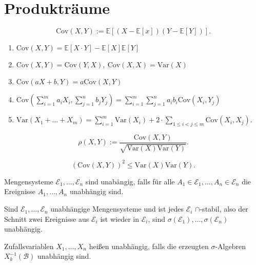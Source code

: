 \documentclass[prb,12pt, twocolumn]{revtex4-2}
\theoremstyle{definition}
\theoremstyle{definition}
\theoremstyle{definition}
\begin{document}
\section{Produktr\"{a}ume}
\begin{Note}[Kovarianz]
	\[
		\text{Cov}(X,Y):= \mathbb{E}[(X-\mathbb{E}[x])(Y-\mathbb{E}[Y])]
	.\] 
\end{Note}
\begin{Note}
	\begin{enumerate}
	\item $\text{Cov}(X, Y) = \mathbb{E}[X\cdot Y] - \mathbb{E}[X]\mathbb{E}[Y]$
	\item  $\text{Cov}(X,Y)=\text{Cov}(Y,X),~\text{Cov}(X,X)=\text{Var}(X)$
	\item  $\text{Cov}(aX+b, Y) = a\text{Cov}(X, Y)$ 
	\item $\displaystyle \text{Cov}\left( \sum_{i=1}^m a_i X_i, \sum_{j=1}^n b_j Y_j \right)= \sum_{i=1}^m \sum_{j=1}^n a_i b_i \text{Cov}(X_i, Y_j) $
	\item $\text{Var}(X_1+\dots + X_m) = \sum_{i=1}^{m} \text{Var}(X_i) + 2\cdot \sum_{1\le i < j \le m} \text{Cov}(X_i, X_j)$.
	\end{enumerate}
\end{Note}
\begin{Note}[Korrelationskoeffizient]
	\[
		\rho(X, Y) :=\frac{\text{Cov}(X, Y)}{\sqrt{\text{Var}(X)\text{Var}(Y)} }
	.\] 
\end{Note}
\begin{Note}
	\[
		(\text{Cov}(X, Y))^2 \le \text{Var}(X)\text{Var}(Y)
	.\] 
\end{Note}
\begin{Note}
	Mengensysteme $\mathcal{E}_1, \dots, \mathcal{E}_n$ sind unab\"{a}ngig, falls f\"{u}r alle $A_1\in \mathcal{E}_1, \dots, A_n \in \mathcal{E}_n$ die Ereignisse $A_1, \dots, A_n$ unabh\"{a}ngig sind.
\end{Note}
\begin{Note}
	Sind $\mathcal{E}_1, \dots, \mathcal{E}_n$ unabh\"{a}ngige Mengensysteme und ist jedes $\mathcal{E}_i$ $\cap$-stabil, also der Schnitt zwei Ereignisse aus $\mathcal{E}_i$ ist wieder in $\mathcal{E}_i$, sind $\sigma(\mathcal{E}_1), \dots, \sigma(\mathcal{E}_n)$ unabh\"{a}ngig.
\end{Note}
\begin{Note}
	Zufallsvariablen $X_1, \dots, X_n$ heißen unabhängig, falls die erzeugten $\sigma$-Algebren $X_k^{-1}(\mathcal{B})$ unabh\"{a}ngig sind.
\end{Note}
\end{document}
